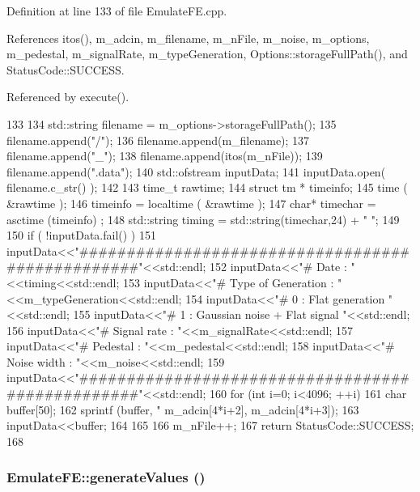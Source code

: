 Definition at line 133 of file EmulateFE.cpp.

References itos(), m\_\-adcin, m\_\-filename, m\_\-nFile, m\_\-noise, m\_\-options, m\_\-pedestal, m\_\-signalRate, m\_\-typeGeneration, Options::storageFullPath(), and StatusCode::SUCCESS.

Referenced by execute().


\begin{DoxyCode}
133                                     {
134   std::string filename = m_options->storageFullPath();
135   filename.append("/");
136   filename.append(m_filename);
137   filename.append("_");
138   filename.append(itos(m_nFile));
139   filename.append(".data");
140   std::ofstream inputData;
141   inputData.open( filename.c_str() );
142 
143   time_t rawtime;
144   struct tm * timeinfo;  
145   time ( &rawtime );
146   timeinfo = localtime ( &rawtime );
147   char* timechar =  asctime (timeinfo) ;
148   std::string timing = std::string(timechar,24) + " ";
149 
150   if ( !inputData.fail() ){
151     inputData<<"#################################################"<<std::endl;
152     inputData<<"# Date : "<<timing<<std::endl;
153     inputData<<"# Type of Generation : "<<m_typeGeneration<<std::endl;
154     inputData<<"#      0 : Flat generation "<<std::endl;
155     inputData<<"#      1 : Gaussian noise + Flat signal "<<std::endl;
156     inputData<<"#                 Signal rate : "<<m_signalRate<<std::endl;
157     inputData<<"#                 Pedestal    : "<<m_pedestal<<std::endl;
158     inputData<<"#                 Noise width : "<<m_noise<<std::endl;    
159     inputData<<"#################################################"<<std::endl;
160     for (int i=0; i<4096; ++i){
161       char buffer[50];
162       sprintf (buffer, "%
      m_adcin[4*i+2], m_adcin[4*i+3]);
163       inputData<<buffer;
164     }
165   }
166   m_nFile++;
167   return StatusCode::SUCCESS;
168 }
\end{DoxyCode}
\hypertarget{classEmulateFE_ae557d3569b9285a871c502b93ba20494}{
\subsubsection[{generateValues}]{ EmulateFE::generateValues ()}}
\label{classEmulateFE_ae557d3569b9285a871c502b93ba20494}


